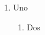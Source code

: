 \documentclass{article}
\begin{document}
\begin{enumerate}
\item Uno
\begin{enumerate}
\item Dos
\end{enumerate}
\end{enumerate}
\end{document}
